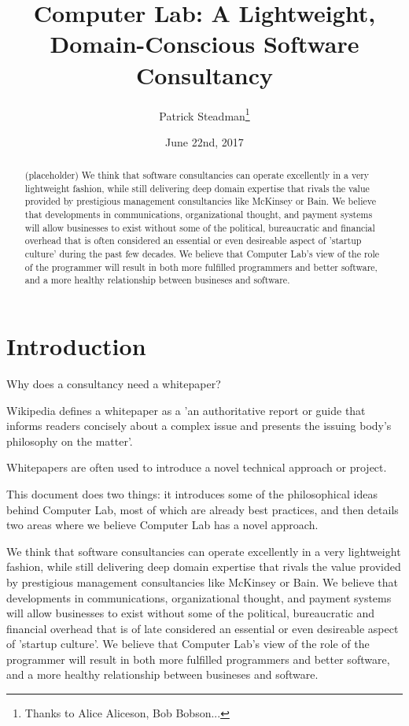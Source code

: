 \documentclass[12pt]{article}
\title{Computer Lab: A Lightweight, Domain-Conscious Software Consultancy}
\author{Patrick Steadman\thanks{Thanks to Alice Aliceson, Bob Bobson...}}
\date{June 22nd, 2017}
\begin{document}
\maketitle

\begin{abstract}
(placeholder)
We think that software consultancies can operate excellently in a very
lightweight fashion, while still delivering deep domain expertise that rivals
the value provided by prestigious management consultancies like McKinsey or
Bain. We believe that developments in communications, organizational thought,
and payment systems will allow businesses to exist without some of the
political, bureaucratic and financial overhead that is often considered an
essential or even desireable aspect of 'startup culture' during the past few
decades. We believe that Computer Lab's view of the role of the programmer will
result in both more fulfilled programmers and better software, and a more
healthy relationship between busineses and software.
\end{abstract}

\section{Introduction}

Why does a consultancy need a whitepaper?

Wikipedia defines a whitepaper as a 'an authoritative report or guide that
informs readers concisely about a complex issue and presents the issuing body's
philosophy on the matter'.

Whitepapers are often used to introduce a novel technical approach or project.

This document does two things: it introduces some of the philosophical ideas
behind Computer Lab, most of which are already best practices, and then details
two areas where we believe Computer Lab has a novel approach.

We think that software consultancies can operate excellently in a very
lightweight fashion, while still delivering deep domain expertise that rivals
the value provided by prestigious management consultancies like McKinsey or
Bain. We believe that developments in communications, organizational thought,
and payment systems will allow businesses to exist without some of the
political, bureaucratic and financial overhead that is of late considered an
essential or even desireable aspect of 'startup culture'. We believe that
Computer Lab's view of the role of the programmer will result in both more
fulfilled programmers and better software, and a more healthy relationship
between busineses and software.
\end{document}
